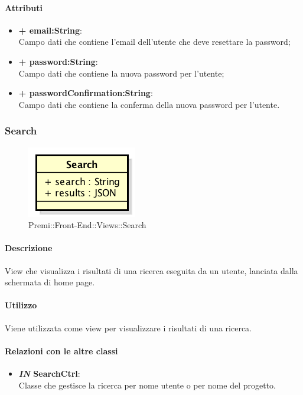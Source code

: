 	\paragraph{Attributi}
	\begin{itemize}
		\item \textbf{+ email:String}: \\
		Campo dati che contiene l'email dell'utente che deve resettare la password;
		\item \textbf{+ password:String}: \\
		Campo dati che contiene la nuova password per l'utente;
		\item \textbf{+ passwordConfirmation:String}: \\
		Campo dati che contiene la conferma della nuova password per l'utente.
	\end{itemize}
\newpage
	

\subsubsection{Search}
	\begin{figure}[h]
		\centering
		\includegraphics[width=0.3\linewidth]{img/premi_front_end_views_search}
		\caption[Premi::Front-End::Views::Search]{Premi::Front-End::Views::Search}
	\end{figure}
	
	\paragraph{Descrizione}
	View che visualizza i risultati di una ricerca eseguita da un utente, lanciata dalla schermata di home page.
	
	\paragraph{Utilizzo}
	Viene utilizzata come view per visualizzare i risultati di una ricerca.
	
	\paragraph{Relazioni con le altre classi}
	\begin{itemize}
		\item \textbf{\textit{IN} SearchCtrl}:\\
		Classe che gestisce la ricerca per nome utente o per nome del progetto.
	\end{itemize}
	
